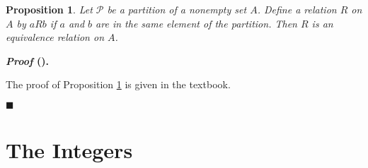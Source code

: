 \documentclass[12pt,a4paper]{article}
\newtheorem{prop}{Proposition}[subsection]
\newcounter{nprf}[subsection]
\newenvironment*{prf}{\par\indent\textbf{\textit{Proof} (\stepcounter{nprf}\thenprf). }\par }{\par\hfill $\blacksquare$\par}
\def\part{{\mathscr{P}}}
\begin{document}
\begin{prop}\label{prop4.2.3} Let $\part$ be a partition of a nonempty set $A$. Define a relation $R$ on $A$ by $aRb$ if $a$ and $b$ are in the same element of the partition. Then $R$ is an equivalence relation on $A$. \end{prop}
\begin{prf} The proof of Proposition \ref{prop4.2.3} is given in the textbook. \end{prf}


\newpage
\section{The Integers}
\end{document}
